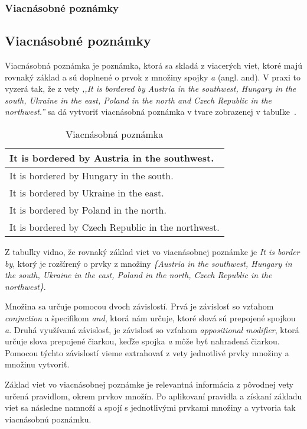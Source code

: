 %
%
{
	\subsubsection{Viacnásobné poznámky}
}
{
	\subsection{Viacnásobné poznámky}
}
Viacnásobná poznámka je poznámka, ktorá sa skladá z viacerých viet, ktoré majú rovnaký základ a sú doplnené o prvok z množiny spojky \textit{a} (angl. and). V praxi to vyzerá tak, že z vety \textit{,,It is bordered by Austria in the southwest, Hungary in the south, Ukraine in the east, Poland in the north and Czech Republic in the northwest.''} sa dá vytvoriť viacnásobná poznámka v tvare zobrazenej v tabuľke~.

\begin{table}[H]
	\centering
	\caption{Viacnásobná poznámka}
	\label{system:table:multinote}
	\begin{tabular}{|l|}
		\hline
		It is bordered by Austria in the southwest. \\ \hline
		It is bordered by Hungary in the south. \\ \hline
		It is bordered by Ukraine in the east. \\ \hline
		It is bordered by Poland in the north.\\ \hline
		It is bordered by Czech Republic in the northwest. \\ \hline
	\end{tabular}
\end{table}

Z tabuľky vidno, že rovnaký základ viet vo viacnásobnej poznámke je \textit{It is border by}, ktorý je rozšírený o prvky z množiny \textit{\{Austria in the southwest, Hungary in the south, Ukraine in the east, Poland in the north, Czech Republic in the northwest\}}.

Množina sa určuje pomocou dvoch závislostí. Prvá je závislosť so vzťahom \textit{conjuction} a špecifikom \textit{and}, ktorá nám určuje, ktoré slová sú prepojené spojkou \textit{a}. Druhá využívaná závislosť, je závislosť so vzťahom \textit{appositional modifier}, ktorá určuje slova prepojené čiarkou, keďže spojka \textit{a} môže byť nahradená čiarkou. Pomocou týchto závislostí vieme extrahovať z vety jednotlivé prvky množiny a množinu vytvoriť.

Základ viet vo viacnásobnej poznámke je relevantná informácia z pôvodnej vety určená pravidlom, okrem prvkov množín. Po aplikovaní pravidla a získaní základu viet sa následne namnoží a spojí s jednotlivými prvkami množiny a vytvoria tak viacnásobnú poznámku.

